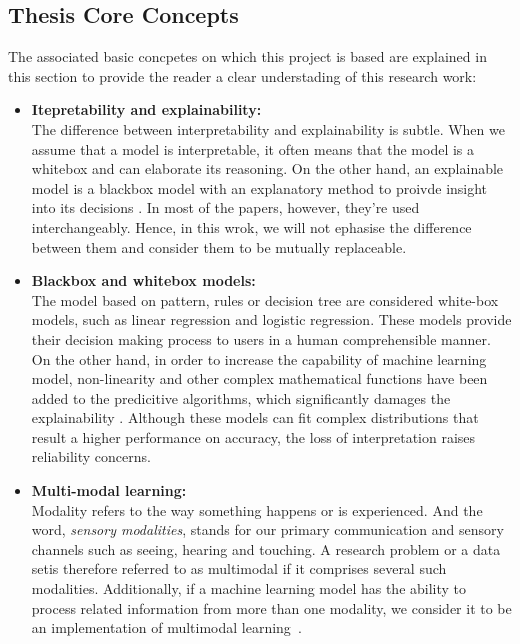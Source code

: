 \subsection{Thesis Core Concepts}
The associated basic concpetes on which this project is based are explained in this section to provide the reader a clear understading of this research work:

\begin{itemize}
    \item \textbf{Itepretability and explainability:} \\ The difference between interpretability and explainability is subtle. When we assume that a model is interpretable, it often means that the model is a whitebox and can elaborate its reasoning. On the other hand, an explainable model is a blackbox model with an explanatory method to proivde insight into its decisions \citep{doshivelez2017RigorousInterpretable}. In most of the papers, however, they're used interchangeably. Hence, in this wrok, we will not ephasise the difference between them and consider them to be mutually replaceable.
    
    \item \textbf{Blackbox and whitebox models:} \\ The model based on pattern, rules or decision tree are considered white-box models, such as linear regression and logistic regression. These models provide their decision making process to users in a human comprehensible manner. On the other hand, in order to increase the capability of machine learning model, non-linearity and other complex mathematical functions have been added to the predicitive algorithms, which significantly damages the explainability \citep{LoyolaGonzalez2019BlackBoxVsWhiteBox}. Although  these models can fit complex distributions that result a higher performance on accuracy, the loss of interpretation raises reliability concerns. 
    
    \item \textbf{Multi-modal learning:} \\ Modality refers to the way something happens or is experienced. And the word, \textit{sensory modalities}, stands for our primary communication and sensory channels such as seeing, hearing and touching. A research problem or a data setis therefore referred to as multimodal if it comprises several such modalities. Additionally, if a machine learning model has the ability to process related information from more than one modality, we consider it to be an implementation of multimodal learning~\citep{Baltrusaitis2019MutimodalSurvey}.
\end{itemize}


